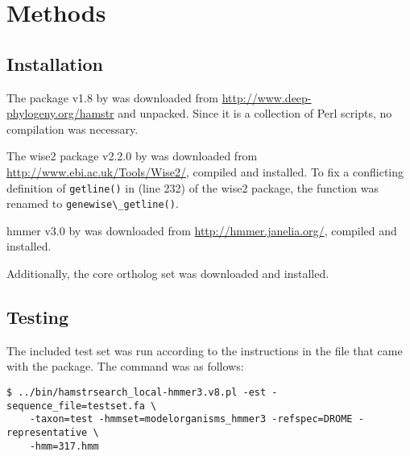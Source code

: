 \section{Methods}
\subsection{Installation}
The \hamstr package v1.8 by \cite{Ebersberger2009} was downloaded from \url{http://www.deep-phylogeny.org/hamstr} and unpacked. Since it is a collection of Perl scripts, no compilation was necessary.

The wise2 package v2.2.0 by \cite{Birney2004} was downloaded from \url{http://www.ebi.ac.uk/Tools/Wise2/}, compiled and installed. To fix a conflicting definition of \lstinline{getline()} in  (line 232) of the wise2 package, the function was renamed to \lstinline{genewise\_getline()}. 

hmmer v3.0 by \cite{Eddy2009} was downloaded from \url{http://hmmer.janelia.org/}, compiled and installed.

Additionally, the  core ortholog set was downloaded and installed.

\subsection{Testing}
The included test set was run according to the instructions in the  file that came with the \hamstr package. The command was as follows:

\begin{verbatim}
$ ../bin/hamstrsearch_local-hmmer3.v8.pl -est -sequence_file=testset.fa \
	-taxon=test -hmmset=modelorganisms_hmmer3 -refspec=DROME -representative \
	-hmm=317.hmm
\end{verbatim}

